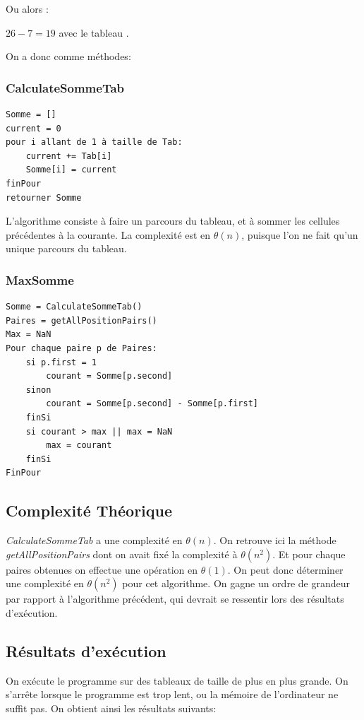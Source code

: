 \documentclass[a4paper, 12pt]{article}
\begin{document}
    Ou alors :

    \noindent $26 - 7 = 19$ avec le tableau .

    \noindent On a donc comme méthodes:
\subsubsection{CalculateSommeTab}
\begin{verbatim}
Somme = []
current = 0
pour i allant de 1 à taille de Tab:
    current += Tab[i]
    Somme[i] = current
finPour
retourner Somme
\end{verbatim}
L'algorithme consiste à faire un parcours du tableau, et à sommer les cellules précédentes à la courante. La complexité est en $\theta(n)$, puisque l'on ne fait qu'un unique parcours du tableau.
\subsubsection{MaxSomme}
\begin{verbatim}
Somme = CalculateSommeTab()
Paires = getAllPositionPairs()
Max = NaN
Pour chaque paire p de Paires:
    si p.first = 1
        courant = Somme[p.second]
    sinon
        courant = Somme[p.second] - Somme[p.first]
    finSi
    si courant > max || max = NaN
        max = courant
    finSi
FinPour	
\end{verbatim}
\subsection{Complexité Théorique}
\emph{CalculateSommeTab} a une complexité en $\theta(n)$. On retrouve ici la méthode \emph{getAllPositionPairs} dont on avait fixé la complexité à $\theta(n^2)$. Et pour chaque paires obtenues on effectue une opération en $\theta(1)$. On peut donc déterminer une complexité en $\theta(n^2)$ pour cet algorithme. On gagne un ordre de grandeur par rapport à l'algorithme précédent, qui devrait se ressentir lors des résultats d’exécution. 
\subsection{Résultats d’exécution}
On exécute le programme sur des tableaux de taille de plus en plus grande. On s'arrête lorsque le programme est trop lent, ou la mémoire de l'ordinateur ne suffit pas. On obtient ainsi les résultats suivants:
\end{document}
